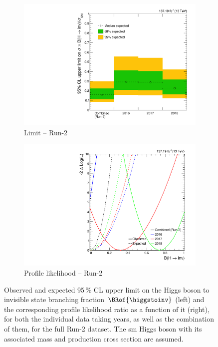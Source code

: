 \begin{figure}[htbp]
    \centering
    \begin{subfigure}[t]{0.45\textwidth}
        \includegraphics[width=\textwidth]{figures/limits/full_Run2/limit_Run2_comb_per_year.pdf}
        \caption{Limit -- Run-2}
    \end{subfigure}
    \hspace{0.05\textwidth}
    \begin{subfigure}[t]{0.45\textwidth}
        \includegraphics[width=\textwidth]{figures/likelihood_scan/profile_likelihood_scan_Run2_per_year.pdf}
        \caption{Profile likelihood -- Run-2}
    \end{subfigure}
    \caption[Observed and expected 95\,\% CL upper limit on the Higgs boson to invisible state branching fraction $\BRof{\higgstoinv}$ and the corresponding profile likelihood ratio as a function of it, for both the individual data taking years, as well as the combination of them, for the full Run-2 dataset]{Observed and expected 95\,\% CL upper limit on the Higgs boson to invisible state branching fraction $\BRof{\higgstoinv}$ (left) and the corresponding profile likelihood ratio as a function of it (right), for both the individual data taking years, as well as the combination of them, for the full Run-2 dataset. The \acrlong{sm} Higgs boson with its associated mass and production cross section are assumed.}
    \label{fig:htoinv_limit_likelihood_Run2_per_year}
\end{figure}

